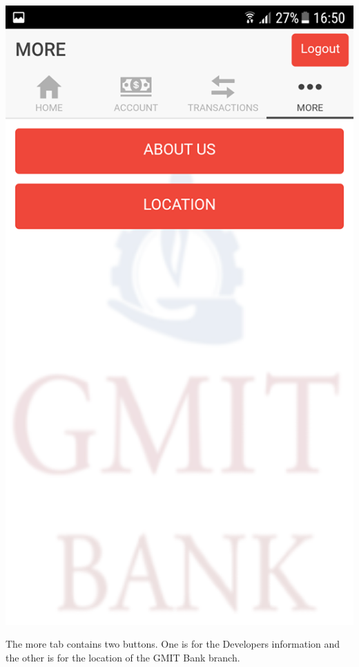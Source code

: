 \paragraph{} 
\begin{center}    
    \includegraphics[scale=0.5]{img/16morepage.png}
\end{center}
The more tab contains two buttons. One is for the Developers information and the other is for the location of the GMIT Bank branch.
